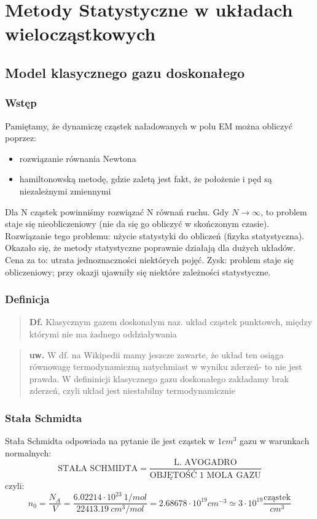 \section{Metody Statystyczne w układach wielocząstkowych}
\subsection{Model klasycznego gazu doskonałego}
\subsubsection{Wstęp}
Pamiętamy, że dynamiczę cząstek naładowanych w polu EM można obliczyć poprzez:
\begin{itemize}
\item rozwiązanie równania Newtona
\item hamiltonowską metodę, gdzie zaletą jest fakt, że położenie i pęd są niezależnymi zmiennymi
\end{itemize}
Dla N cząstek powinniśmy rozwiązać N równań ruchu. Gdy $N\rightarrow\infty$, to problem staje się nieobliczeniowy (nie da się go obliczyć w skończonym czasie).\\
Rozwiązanie tego problemu: użycie statystyki do obliczeń (fizyka statystyczna). Okazało się, że metody statystyczne poprawnie działają dla dużych układów. Cena za to: utrata jednoznaczności niektórych pojęć. Zysk: problem staje się obliczeniowy; przy okazji ujawniły się niektóre zależności statystyczne. 
\subsubsection{Definicja}
\begin{verse}\textbf{Df.} Klasycznym gazem doskonałym naz. układ cząstek punktowch, między którymi nie ma żadnego oddziaływania \end{verse}
\begin{verse}\textbf{uw.} W df. na Wikipedii mamy jeszcze zawarte, że układ ten osiąga równowagę termodynamiczną natychmiast w wyniku zderzeń- to nie jest prawda. W defininicji klasycznego gazu doskonałego zakładamy brak zderzeń, czyli układ jest niestabilny termodynamicznie \end{verse}
\subsubsection{Stała Schmidta}
Stała Schmidta odpowiada na pytanie ile jest cząstek w $1 cm^3$ gazu w warunkach normalnych:
\begin{equation}\text{STAŁA SCHMIDTA}=\frac{\text{L. AVOGADRO}}{\text{OBJĘTOŚĆ 1 MOLA GAZU}}\end{equation}
czyli:
\begin{equation}n_0=\frac{N_A}{V}=\frac{6.02214\cdot 10^{23} ~{1/mol}}{22413.19 ~cm^3/mol}=2.68678\cdot 10^{19} cm^{-3} \simeq 3\cdot 10^{19} \frac{\text{cząstek}}{cm^3}\end{equation}
